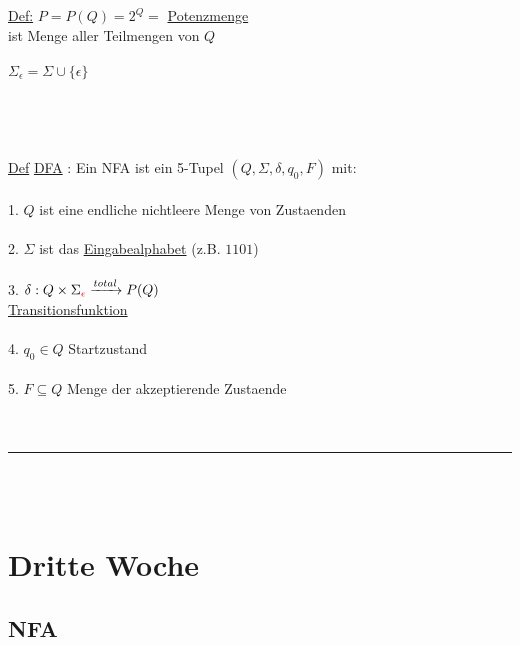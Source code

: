 \documentclass[18pt,a4paper]{scrreprt}
\newcommand{\tab}{\hspace*{2em}}
\begin{document}
\uline{Def:} \: $P = P(Q) = 2^Q =$ \uline{Potenzmenge} \\
ist Menge aller Teilmengen von $Q$ \\
\\
$\Sigma_{\epsilon} = \Sigma \cup \{\epsilon\}$\\
\\
\\
\\
\\
\uline{Def}  \uline{DFA} : Ein NFA ist ein 5-Tupel $(Q, \Sigma, \delta, q_0, F)$ mit:\\
\\
1. $Q$ ist eine endliche nichtleere Menge von Zustaenden\\
\\
2. $\Sigma$ ist das \uline{Eingabealphabet} (z.B. $1101$)\\
\\
3. $\delta : Q \times \Sigma_{\textcolor{red}{\epsilon}} \xrightarrow{total} P(Q)$\\
\tab \uline{Transitionsfunktion}\\
\\
4. $q_0 \in Q$ Startzustand\\
\\
5. $F \subseteq Q$ Menge der akzeptierende Zustaende\\
\\
\\
\rule{\textwidth}{0.4mm}\\
\\

\chapter{Dritte Woche}


\section{NFA}
\end{document}

